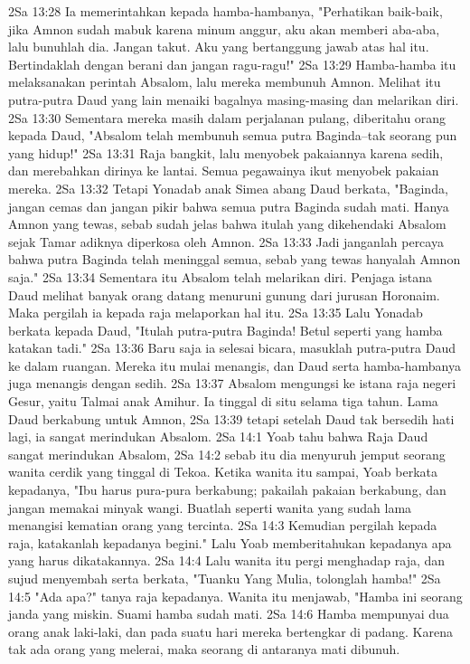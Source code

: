 2Sa 13:28  Ia memerintahkan kepada hamba-hambanya, "Perhatikan baik-baik, jika Amnon sudah mabuk karena minum anggur, aku akan memberi aba-aba, lalu bunuhlah dia. Jangan takut. Aku yang bertanggung jawab atas hal itu. Bertindaklah dengan berani dan jangan ragu-ragu!"
2Sa 13:29  Hamba-hamba itu melaksanakan perintah Absalom, lalu mereka membunuh Amnon. Melihat itu putra-putra Daud yang lain menaiki bagalnya masing-masing dan melarikan diri.
2Sa 13:30  Sementara mereka masih dalam perjalanan pulang, diberitahu orang kepada Daud, "Absalom telah membunuh semua putra Baginda--tak seorang pun yang hidup!"
2Sa 13:31  Raja bangkit, lalu menyobek pakaiannya karena sedih, dan merebahkan dirinya ke lantai. Semua pegawainya ikut menyobek pakaian mereka.
2Sa 13:32  Tetapi Yonadab anak Simea abang Daud berkata, "Baginda, jangan cemas dan jangan pikir bahwa semua putra Baginda sudah mati. Hanya Amnon yang tewas, sebab sudah jelas bahwa itulah yang dikehendaki Absalom sejak Tamar adiknya diperkosa oleh Amnon.
2Sa 13:33  Jadi janganlah percaya bahwa putra Baginda telah meninggal semua, sebab yang tewas hanyalah Amnon saja."
2Sa 13:34  Sementara itu Absalom telah melarikan diri. Penjaga istana Daud melihat banyak orang datang menuruni gunung dari jurusan Horonaim. Maka pergilah ia kepada raja melaporkan hal itu.
2Sa 13:35  Lalu Yonadab berkata kepada Daud, "Itulah putra-putra Baginda! Betul seperti yang hamba katakan tadi."
2Sa 13:36  Baru saja ia selesai bicara, masuklah putra-putra Daud ke dalam ruangan. Mereka itu mulai menangis, dan Daud serta hamba-hambanya juga menangis dengan sedih.
2Sa 13:37  Absalom mengungsi ke istana raja negeri Gesur, yaitu Talmai anak Amihur. Ia tinggal di situ selama tiga tahun. Lama Daud berkabung untuk Amnon,
2Sa 13:39  tetapi setelah Daud tak bersedih hati lagi, ia sangat merindukan Absalom.
2Sa 14:1  Yoab tahu bahwa Raja Daud sangat merindukan Absalom,
2Sa 14:2  sebab itu dia menyuruh jemput seorang wanita cerdik yang tinggal di Tekoa. Ketika wanita itu sampai, Yoab berkata kepadanya, "Ibu harus pura-pura berkabung; pakailah pakaian berkabung, dan jangan memakai minyak wangi. Buatlah seperti wanita yang sudah lama menangisi kematian orang yang tercinta.
2Sa 14:3  Kemudian pergilah kepada raja, katakanlah kepadanya begini." Lalu Yoab memberitahukan kepadanya apa yang harus dikatakannya.
2Sa 14:4  Lalu wanita itu pergi menghadap raja, dan sujud menyembah serta berkata, "Tuanku Yang Mulia, tolonglah hamba!"
2Sa 14:5  "Ada apa?" tanya raja kepadanya. Wanita itu menjawab, "Hamba ini seorang janda yang miskin. Suami hamba sudah mati.
2Sa 14:6  Hamba mempunyai dua orang anak laki-laki, dan pada suatu hari mereka bertengkar di padang. Karena tak ada orang yang melerai, maka seorang di antaranya mati dibunuh.
